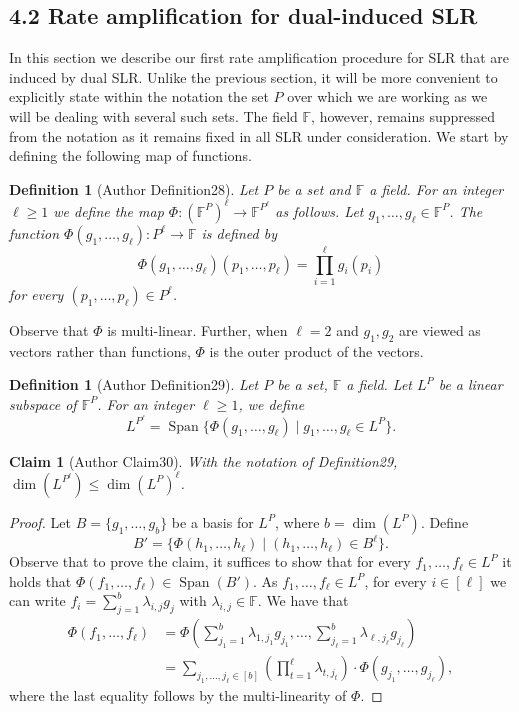 \documentclass[10pt,a4paper]{article}
\newtheorem{ntdefinition}[nttheorem]{Definition}
\newtheorem{ntclaim}[nttheorem]{Claim}
\begin{document}
\subsection*{4.2 Rate amplification for dual-induced SLR}
In this section we describe our first rate amplification procedure for SLR that are induced by dual SLR. Unlike the previous section, it will be more convenient to explicitly state within the notation the set $P$ over which we are working as we will be dealing with several such sets. The field $\mathbb F$, however, remains suppressed from the notation as it remains fixed in all SLR under consideration. We start by defining the following map of functions.
\setcounter{nttheorem}{27}
\begin{ntdefinition}[Author Definition28]
Let $P$ be a set and $\mathbb F$ a field. For an integer $\ell\geq1$ we define the map $\Phi:(\mathbb F^P)^\ell\to\mathbb F^{P^\ell}$ as follows. Let $g_1,\ldots,g_\ell\in\mathbb F^P$. The function $\Phi(g_1,\ldots,g_\ell):P^\ell\to\mathbb F$ is defined by
\[\Phi(g_1,\ldots,g_\ell)(p_1,\ldots,p_\ell)=\prod_{i=1}^\ell g_i(p_i)\]
for every $(p_1,\ldots,p_\ell)\in P^\ell$.
\end{ntdefinition}
Observe that $\Phi$ is multi-linear. Further, when $\ell=2$ and $g_1,g_2$ are viewed as vectors rather than functions, $\Phi$ is the outer product of the vectors.
\begin{ntdefinition}[Author Definition29]
Let $P$ be a set, $\mathbb F$ a field. Let $L^P$ be a linear subspace of $\mathbb F^P$. For an integer $\ell\geq1$, we define
\[L^{P^\ell}=\operatorname{Span}\{\Phi(g_1,\ldots,g_\ell)\mid g_1,\ldots,g_\ell\in L^P\}.\]
\end{ntdefinition}
\begin{ntclaim}[Author Claim30]
With the notation of Definition29, $\dim(L^{P^\ell})\leq\dim(L^P)^\ell$.
\end{ntclaim}
\begin{proof}
Let $B=\{g_1,\ldots,g_b\}$ be a basis for $L^P$, where $b=\dim(L^P)$. Define
\[B'=\{\Phi(h_1,\ldots,h_\ell)\mid(h_1,\ldots,h_\ell)\in B^\ell\}.\]
Observe that to prove the claim, it suffices to show that for every $f_1,\ldots,f_\ell\in L^P$ it holds that $\Phi(f_1,\ldots,f_\ell)\in\operatorname{Span}(B')$. As $f_1,\ldots,f_\ell\in L^P$, for every $i\in[\ell]$ we can write $f_i=\sum_{j=1}^b\lambda_{i,j}g_j$ with $\lambda_{i,j}\in\mathbb F$. We have that
\begin{align*}
\Phi(f_1,\ldots,f_\ell)&=\Phi\left(\sum_{j_1=1}^b\lambda_{1,j_1}g_{j_1},\ldots,\sum_{j_\ell=1}^b\lambda_{\ell,j_\ell}g_{j_\ell}\right)\\
&=\sum_{j_1,\ldots,j_\ell\in[b]}\left(\prod_{t=1}^\ell\lambda_{t,j_t}\right)\cdot\Phi(g_{j_1},\ldots,g_{j_\ell}),
\end{align*}
where the last equality follows by the multi-linearity of $\Phi$.
\end{proof}
\end{document}
